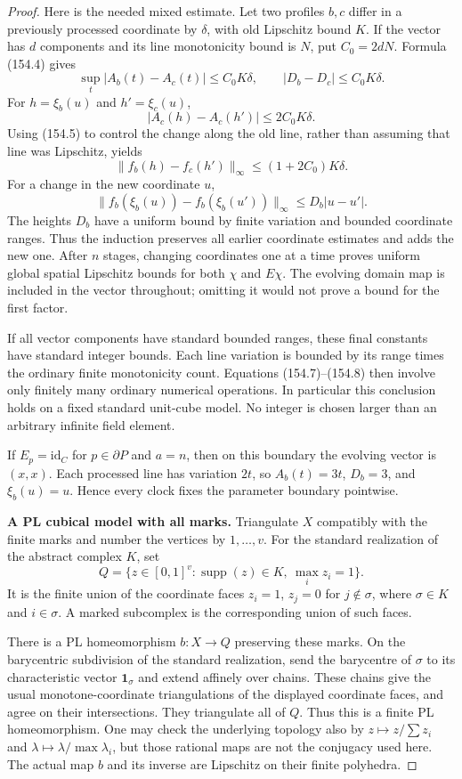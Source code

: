 \begin{proof}
Here is the needed mixed estimate. Let two profiles $b,c$
differ in a previously processed coordinate by $\delta$,
with old Lipschitz bound $K$. If the vector has $d$
components and its line monotonicity bound is $N$, put
$C_0=2dN$. Formula (154.4) gives
\[
 \sup_t|A_b(t)-A_c(t)|\le C_0K\delta,\qquad
 |D_b-D_c|\le C_0K\delta.
\]
For $h=\xi_b(u)$ and $h'=\xi_c(u)$,
\[
 |A_c(h)-A_c(h')|\le2C_0K\delta.
\]
Using (154.5) to control the change along the old line,
rather than assuming that line was Lipschitz, yields
\[
 \|f_b(h)-f_c(h')\|_\infty
       \le(1+2C_0)K\delta.
 \tag{154.7}
\]
For a change in the new coordinate $u$,
\[
 \|f_b(\xi_b(u))-f_b(\xi_b(u'))\|_\infty
       \le D_b|u-u'|.
 \tag{154.8}
\]
The heights $D_b$ have a uniform bound by finite variation
and bounded coordinate ranges. Thus the induction preserves
all earlier coordinate estimates and adds the new one.
After $n$ stages, changing coordinates one at a time proves
uniform global spatial Lipschitz bounds for both $\chi$
and $E\chi$. The evolving domain map is included in the
vector throughout; omitting it would not prove a bound
for the first factor.

If all vector components have standard bounded ranges,
these final constants have standard integer bounds.
Each line variation is bounded by its range times the
ordinary finite monotonicity count. Equations (154.7)--(154.8)
then involve only finitely many ordinary numerical operations.
In particular this conclusion holds on a fixed standard
unit-cube model. No integer is chosen larger than an
arbitrary infinite field element.

If $E_p=\mathrm{id}_C$ for $p\in\partial P$ and $a=n$,
then on this boundary the evolving vector is $(x,x)$.
Each processed line has variation $2t$, so $A_b(t)=3t$,
$D_b=3$, and $\xi_b(u)=u$. Hence every clock fixes the
parameter boundary pointwise.

\textbf{A PL cubical model with all marks.}\quad
Triangulate $X$ compatibly with the finite marks and number
the vertices by $1,\ldots,v$. For the standard realization
of the abstract complex $K$, set
\[
 Q=\{z\in[0,1]^v:
       \operatorname{supp}(z)\in K,\ \max_i z_i=1\}.
 \tag{154.9}
\]
It is the finite union of the coordinate faces
$z_i=1$, $z_j=0$ for $j\notin\sigma$, where
$\sigma\in K$ and $i\in\sigma$. A marked subcomplex is
the corresponding union of such faces.

There is a PL homeomorphism $b:X\to Q$ preserving these
marks. On the barycentric subdivision of the standard
realization, send the barycentre of $\sigma$ to its
characteristic vector $\mathbf1_\sigma$ and extend
affinely over chains. These chains give the usual
monotone-coordinate triangulations of the displayed
coordinate faces, and agree on their intersections.
They triangulate all of $Q$. Thus this is a finite
PL homeomorphism. One may check the underlying topology
also by $z\mapsto z/\sum z_i$ and
$\lambda\mapsto\lambda/\max\lambda_i$, but those rational
maps are not the conjugacy used here. The actual map $b$
and its inverse are Lipschitz on their finite polyhedra.


\end{proof}
